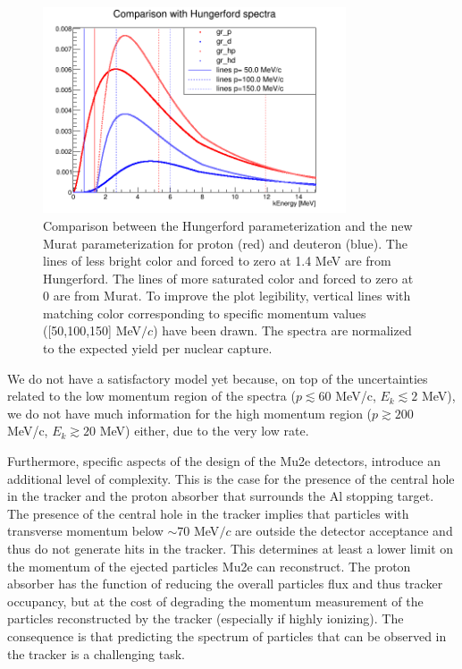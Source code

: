 \documentclass[12pt,a4paper,openright, oneside, titlepage]{book} %
\begin{document}
\begin{figure}[!htb]
\centering
\includegraphics[width =0.8\textwidth, keepaspectratio]{new_spectra_2/comparison2}
\caption[Comparison of spectrum parameteerizations]{Comparison \cite{io:comparison} between the Hungerford parameterization \cite{Hungerford} 
and the new Murat parameterization \cite{Pasha:spectra} for proton (red) and deuteron (blue). 
The lines of less bright color and forced to zero at 1.4 MeV are from Hungerford.
 The lines of more saturated color and forced to zero at 0 are from Murat.
To improve the plot legibility, 
vertical lines with matching color corresponding to specific momentum values ([50,100,150] MeV$/c$) have been drawn. The spectra are normalized to the expected yield per nuclear capture.}
\label{_comparison2}
\end{figure}

\noindent 
We do not have a satisfactory model yet because, 
on top of the uncertainties related to the low momentum region of the spectra
($p \lesssim 60$ MeV/c, $E_k \lesssim 2$ MeV), 
we do not have much information for the high momentum region ($p\gtrsim200$ MeV/c, $E_k\gtrsim 20$ MeV) either, due to the very low rate.

\noindent
Furthermore, specific aspects of the design of the Mu2e detectors, introduce an additional level of complexity. 
This is the case for the presence of the central hole in the tracker and the proton absorber that surrounds the Al stopping target.
The presence of the central hole in the tracker implies that particles with transverse momentum below $\sim70$ MeV$/c$ are outside the detector acceptance and thus do not generate hits in the tracker. 
This determines at least a lower limit on the momentum of the ejected particles Mu2e can reconstruct. 
The proton absorber has the function of reducing the overall particles flux and thus tracker occupancy, but at the cost of degrading the momentum measurement of the particles reconstructed by the tracker (especially if highly ionizing). 
The consequence is that predicting the spectrum of particles that can be observed in the tracker is a challenging task.
\end{document}
